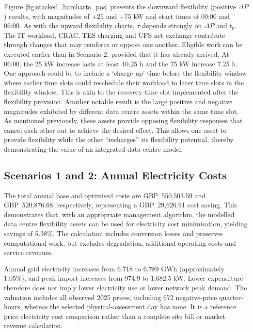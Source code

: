 \documentclass[lettersize,journal]{IEEEtran}
\providecommand{\DIFadd}[1]{{\color{blue}#1}}
\providecommand{\DIFaddbegin}{}
\providecommand{\DIFaddend}{}
\begin{document}
\DIFaddend 

Figure \ref{fig:stacked_barcharts_pos}  \DIFaddbegin \DIFadd{presents }\DIFaddend the downward flexibility  \DIFaddbegin \DIFadd{(positive $\Delta P$) results, with magnitudes of $+25$ and $+75$ kW and start times of 00:00 and 06:00. }\DIFaddend As  with the upward flexibility charts, $\tau$ depends strongly on  $\Delta P$ and $t_0$. The \DIFaddbegin \DIFadd{IT workload, }\DIFaddend CRAC, TES  \DIFaddbegin \DIFadd{charging and UPS net exchange contribute through changes that may reinforce or oppose one another. Eligible work can be executed earlier than in Scenario 2, provided that it has already arrived. At 06:00, the 25 kW increase lasts at least 10.25 h and the 75 kW increase 7.25 h}\DIFaddend . One approach could be to include a `charge up' time before the flexibility window where earlier time slots could reschedule their workload to later time slots in the flexibility window. This is akin to the recovery time slot implemented after the flexibility provision. Another notable result is the large positive and negative magnitudes exhibited by different  \DIFaddbegin \DIFadd{data centre }\DIFaddend assets within the same  \DIFaddbegin \DIFadd{time slot}\DIFaddend . As mentioned previously, these assets provide opposing flexibility responses that cancel each other out to achieve the desired effect. This allows one asset to provide flexibility while the other ``recharges'' its flexibility potential, thereby demonstrating the value of an integrated  \DIFaddbegin \DIFadd{data centre }\DIFaddend model.

\DIFaddbegin \subsection{\DIFadd{Scenarios 1 and 2: Annual Electricity Costs}}
\DIFadd{The total annual base and optimised costs are GBP~550,503.59 and GBP~520,876.68, respectively, representing a GBP~29,626.91 cost saving. This demonstrates that, with an appropriate management algorithm, the modelled data centre flexibility assets can be used for electricity cost minimisation, yielding savings of 5.38\%. The calculation includes conversion losses and preserves computational work, but excludes degradation, additional operating costs and service revenues.

}

\DIFadd{Annual grid electricity increases from 6.718 to 6.789 GWh (approximately 1.05\%), and peak import increases from 974.9 to 1,682.5 kW. Lower expenditure therefore does not imply lower electricity use or lower network peak demand. The valuation includes all observed 2025 prices, including 672 negative-price quarter-hours, whereas the selected physical-assessment day has none. It is a reference price electricity cost comparison rather than a complete site bill or market revenue calculation.

}
\end{document}
